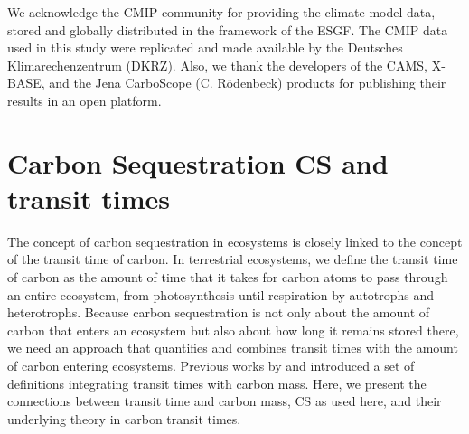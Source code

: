 \documentclass[ProofPDF]{./Styles/Jnls-Template-V3}
\newcommand{\CS}{\mathrm{CS}}
\begin{document}
\begin{acknowledgements}[Acknowledgements]
We acknowledge the CMIP community for providing the climate model data, stored and globally distributed in the framework of the ESGF. The CMIP data used in this study were replicated and made available by the Deutsches Klimarechenzentrum (DKRZ). Also, we thank the developers of the CAMS, X-BASE, and the Jena CarboScope (C. Rödenbeck) products for publishing their results in an open platform.

\end{acknowledgements}

\appendix
\section{Carbon Sequestration CS and transit times} 
\label{sec:appCS}
The concept of carbon sequestration in ecosystems is closely linked to the concept of the transit time of carbon. In terrestrial ecosystems, we define the transit time of carbon as the amount of time that it takes for carbon atoms to pass through an entire ecosystem, from photosynthesis until respiration by autotrophs and heterotrophs. 
Because carbon sequestration is not only about the amount of carbon that enters an ecosystem but also about how long it remains stored there, we need an approach that quantifies and combines transit times with the amount of carbon entering ecosystems. Previous works by \citet{Sierra2021} and \citet{Metzler2024} introduced a set of definitions integrating transit times with carbon mass. 
Here, we present the connections between transit time and carbon mass, $\CS$ as used here, and their underlying theory in carbon transit times.
\end{document}
